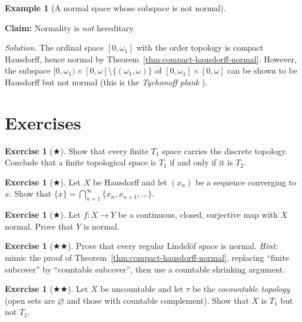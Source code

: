 \documentclass[11pt,a4paper,twoside]{book}
\theoremstyle{remark}
\theoremstyle{definition}
\newtheorem{exampleplain}[theorem]{Example}
\newtheorem{exerciseplain}[theorem]{Exercise}
\theoremstyle{definition}
\newenvironment{example}[1][]{%
  \begin{exampleplain}[#1]\itshape
}{%
  \end{exampleplain}
}
\newenvironment{exercise}[1][]{%
  \begin{exerciseplain}[#1]
}{%
  \end{exerciseplain}
}
\begin{document}
\begin{example}[A normal space whose subspace is not normal]
\label{ex:normal-subspace}
\textbf{Claim:} Normality is \emph{not} hereditary.

\textit{Solution.}  The ordinal space $[0, \omega_1]$ with the order topology
is compact Hausdorff, hence normal by Theorem~\ref{thm:compact-hausdorff-normal}.
However, the subspace $[0, \omega_1) \times [0, \omega] \setminus
\{(\omega_1, \omega)\}$ of $[0,\omega_1] \times [0,\omega]$ can be shown to
be Hausdorff but not normal (this is the \emph{Tychonoff plank}%
).
\end{example}

\section{Exercises}
\label{sec:separation-exercises}

\begin{exercise}[$\bigstar$]\label{exo:T1-finite-hausdorff}
Show that every finite $T_1$ space carries the discrete topology.  Conclude
that a finite topological space is $T_1$ if and only if it is $T_2$.
\end{exercise}

\begin{exercise}[$\bigstar$]\label{exo:hausdorff-convergent-subsequence}
Let $X$ be Hausdorff and let $(x_n)$ be a sequence converging to $x$.  Show
that $\{x\} = \bigcap_{n=1}^\infty \overline{\{x_n, x_{n+1}, \ldots\}}$.
\end{exercise}

\begin{exercise}[$\bigstar$]\label{exo:closed-map-normal}
Let $f \colon X \to Y$ be a continuous, closed, surjective map with $X$ normal.
Prove that $Y$ is normal.
\end{exercise}

\begin{exercise}[$\bigstar\bigstar$]\label{exo:regular-plus-lindelof}
Prove that every regular Lindel\"of space is normal.
\emph{Hint:} mimic the proof of Theorem~\ref{thm:compact-hausdorff-normal},
replacing ``finite subcover'' by ``countable subcover'', then use a
countable shrinking argument.
\end{exercise}

\begin{exercise}[$\bigstar\bigstar$]\label{exo:T1-countable-complement}
Let $X$ be uncountable and let $\tau$ be the \emph{cocountable topology}
(open sets are $\varnothing$ and those with countable complement).  Show that
$X$ is $T_1$ but not $T_2$.
\end{exercise}
\end{document}
